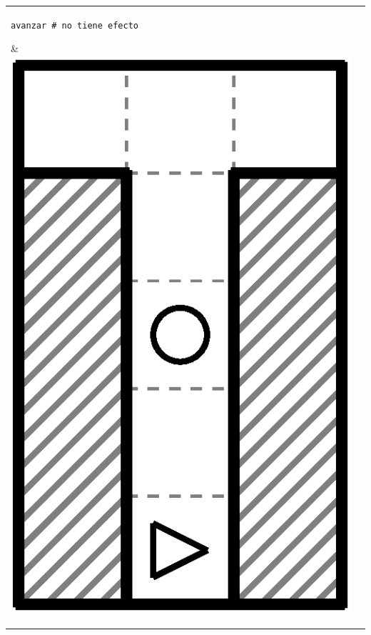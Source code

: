 \documentclass{oci}
\newcommand*{\tabbox}[2][t]{\vspace{0pt}\parbox[#1][2.3\baselineskip]{20em}{\strut#2\strut}}
\begin{document}
\begin{problemDescription}
\begin{center}
\begin{tabular}{|V|V|}
    \tabbox{\texttt{avanzar \# no tiene efecto}}      &\includegraphics[angle=90, scale=0.25]{laberintos/ejemplo1-1.eps}\\

\end{tabular}
\end{center}
\end{problemDescription}
\end{document}

